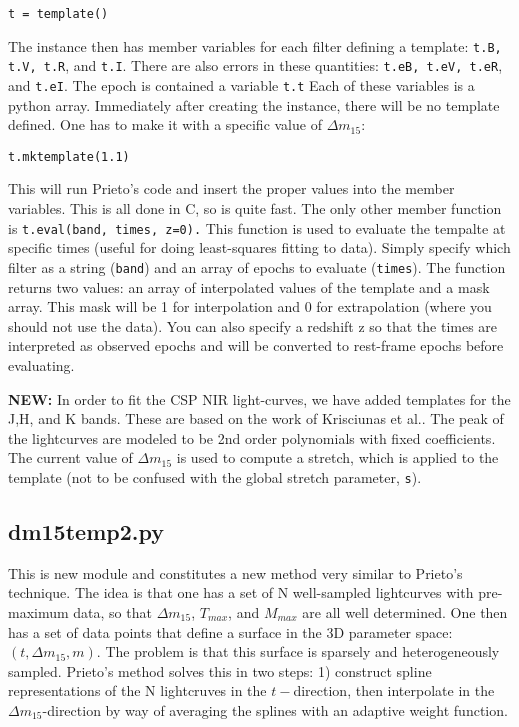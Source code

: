 \documentclass[12pt]{article}
\begin{document}
\begin{verbatim}
t = template()
\end{verbatim}

The instance then has member variables for each filter defining a
template: \texttt{t.B, t.V, t.R}, and \texttt{t.I}. There are also
errors in these quantities: \texttt{t.eB, t.eV, t.eR}, and \texttt{t.eI}.
The epoch is contained a variable \texttt{t.t} Each of these variables
is a python array. Immediately after creating the instance, there
will be no template defined. One has to make it with a specific value
of $\Delta m_{15}$:

\begin{verbatim}
t.mktemplate(1.1)
\end{verbatim}

This will run Prieto's code and insert the proper values into the
member variables. This is all done in C, so is quite fast. The only
other member function is \texttt{t.eval(band, times, z=0).} This function
is used to evaluate the tempalte at specific times (useful for doing
least-squares fitting to data). Simply specify which filter as a string
(\texttt{band}) and an array of epochs to evaluate (\texttt{times}).
The function returns two values: an array of interpolated values of
the template and a mask array. This mask will be 1 for interpolation
and 0 for extrapolation (where you should not use the data). You can
also specify a redshift z so that the times are interpreted as observed
epochs and will be converted to rest-frame epochs before evaluating.

\textbf{NEW:} In order to fit the CSP NIR light-curves, we have added
templates for the J,H, and K bands. These are based on the work of
Krisciunas et al.\cite{Krisciunas2004}. The peak of the lightcurves
are modeled to be 2nd order polynomials with fixed coefficients. The
current value of $\Delta m_{15}$ is used to compute a stretch, which
is applied to the template (not to be confused with the global stretch
parameter, \texttt{s}).


\subsection{dm15temp2.py}

This is new module and constitutes a new method very similar to Prieto's
technique. The idea is that one has a set of N well-sampled lightcurves
with pre-maximum data, so that $\Delta m_{15}$, $T_{max}$, and $M_{max}$
are all well determined. One then has a set of data points that define
a surface in the 3D parameter space: $\left(t,\Delta m_{15},m\right)$.
The problem is that this surface is sparsely and heterogeneously sampled.
Prieto's method solves this in two steps: 1) construct spline representations
of the N lightcruves in the $t-$direction, then interpolate in the
$\Delta m_{15}$-direction by way of averaging the splines with an
adaptive weight function.
\end{document}
